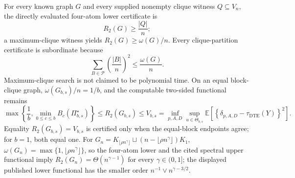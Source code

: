 For every known graph \(G\) and every supplied nonempty clique witness \(Q\subseteq V_n\), the directly evaluated four-atom lower certificate is
\[
R_2(G)\geq\frac{|Q|}{n};
\]
a maximum-clique witness yields \(R_2(G)\geq\omega(G)/n\).  Every clique-partition certificate is subordinate because
\[
\sum_{B\in\mathcal P}\left(\frac{|B|}{n}\right)^2\leq\frac{\omega(G)}n.
\]
Maximum-clique search is not claimed to be polynomial time.  On an equal block-clique graph, \(\omega(G_{b,s})/n=1/b\), and the computable two-sided functional remains
\[
\max\left\{\frac1b,\min_{0\leq c\leq b}B_c(\Pi_{b,s}^{\star})\right\}
\leq R_2(G_{b,s})\leq V_{b,s}
=\inf_{p,A,D}\sup_{u\in\Theta_{b,s}}\mathbb E\!\left[\left\{\delta_{p,A,D}-\tau_{\mathrm{DTE}}(Y)\right\}^2\right].
\]
Equality \(R_2(G_{b,s})=V_{b,s}\) is certified only when the equal-block endpoints agree; for \(b=1\), both equal one.  For \(G_n=K_{\lfloor\rho n^{\gamma}\rfloor}\sqcup(n-\lfloor\rho n^{\gamma}\rfloor)K_1\), \(\omega(G_n)=\max\{1,\lfloor\rho n^{\gamma}\rfloor\}\), so the four-atom lower and the cited spectral upper functional imply \(R_2(G_n)=\Theta(n^{\gamma-1})\) for every \(\gamma\in(0,1]\); the displayed published lower functional has the smaller order \(n^{-1}\vee n^{\gamma-3/2}\).